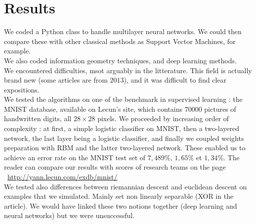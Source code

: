 \documentclass{article}
\begin{document}
\section{Results}

We coded a Python class to handle multilayer neural networks. We could then compare these with other classical methods as Support Vector Machines, for example.\\

We also coded information geometry techniques, and deep learning methods.\\

We encountered difficulties, msot arguably in the litterature. This field is actually brand new (some articles are from $2013$), and it was difficult to find clear expositions.\\

We tested the algorithms on one of the benchmark in supervised learning : the MNIST database, available on Lecun's site, which contains $70 000$ pictures of handwritten digits, all $28 \times 28$ pixels. We proceeded by increasing order of complexity : at first, a simple logistic classifier on MNIST, then a two-layered network, the last layer being a logistic classifier, and finally we coupled weights preparation with RBM and the latter two-layered network. These enabled us to achieve an error rate on the MNIST test set of $7,489\%$, $1,65\%$ et $1,34\%$. The reader can compare our results with scores of research teams on the page  ~\url{http://yann.lecun.com/exdb/mnist/}\\

We tested also differences between riemannian descent and euclidean descent on examples that we simulated. Mainly set non linearly separable (XOR in the article). We would have linked these two notions together (deep learning and neural networks) but we were unsuccessful.



 
\nocite{*}
\end{document}
